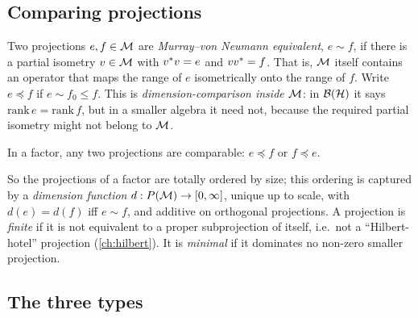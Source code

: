\subsection{Comparing projections}

Two projections $e,f\in\mathcal{M}$ are \emph{Murray--von Neumann equivalent}, $e\sim f$, if there is a partial isometry $v\in\mathcal{M}$ with $v^{*} v=e$ and $vv^{*}=f$. That is, $\mathcal{M}$ itself contains an operator that maps the range of $e$ isometrically onto the range of $f$. Write $e\preceq f$ if $e\sim f_0\le f$. This is \emph{dimension-comparison inside $\mathcal{M}$}: in $\mathcal{B}(\mathcal{H})$ it says $\mathrm{rank}\,e=\mathrm{rank}\,f$, but in a smaller algebra it need not, because the required partial isometry might not belong to $\mathcal{M}$.

\begin{theorem}[comparison]
In a factor, any two projections are comparable: $e\preceq f$ or $f\preceq e$.
\end{theorem}
So the projections of a factor are totally ordered by size; this ordering is captured by a \emph{dimension function} $d:P(\mathcal{M})\to[0,\infty]$, unique up to scale, with $d(e)=d(f)$ iff $e\sim f$, and additive on orthogonal projections. A projection is \emph{finite} if it is not equivalent to a proper subprojection of itself, i.e.\ not a ``Hilbert-hotel'' projection (\cref{ch:hilbert}). It is \emph{minimal} if it dominates no non-zero smaller projection.

\subsection{The three types}

\begin{center}
\renewcommand{\arraystretch}{1.35}
\end{center}

